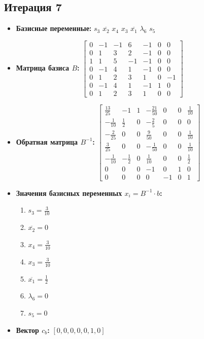 \begin{itemize}
\subsection*{Итерация 7}
\begin{itemize}
\item \textbf{Базисные переменные:}
$s_3$
$\overline{x_2}$
$x_4$
$x_3$
$\overline{x_1}$
$\lambda_6$
$s_5$
\item \textbf{Матрица базиса $B$:}
$\left[\begin{matrix}0 & -1 & -1 & 6 & -1 & 0 & 0\\0 & 1 & 3 & 2 & -1 & 0 & 0\\1 & 1 & 5 & -1 & -1 & 0 & 0\\0 & -1 & 4 & 1 & -1 & 0 & 0\\0 & 1 & 2 & 3 & 1 & 0 & -1\\0 & -1 & 4 & 1 & -1 & 1 & 0\\0 & 1 & 2 & 3 & 1 & 0 & 0\end{matrix}\right]$
\item \textbf{Обратная матрица $B^{-1}$:}
$\left[\begin{matrix}\frac{13}{25} & -1 & 1 & - \frac{21}{50} & 0 & 0 & \frac{1}{10}\\- \frac{1}{10} & \frac{1}{2} & 0 & - \frac{2}{5} & 0 & 0 & 0\\- \frac{2}{25} & 0 & 0 & \frac{9}{50} & 0 & 0 & \frac{1}{10}\\\frac{3}{25} & 0 & 0 & - \frac{1}{50} & 0 & 0 & \frac{1}{10}\\- \frac{1}{10} & - \frac{1}{2} & 0 & \frac{1}{10} & 0 & 0 & \frac{1}{2}\\0 & 0 & 0 & -1 & 0 & 1 & 0\\0 & 0 & 0 & 0 & -1 & 0 & 1\end{matrix}\right]$
\item \textbf{Значения базисных переменных $ x_i = B^{-1} \cdot b$:}
\begin{enumerate}
\item $s_3 = \frac{3}{10}$
\item $\overline{x_2} = 0$
\item $x_4 = \frac{3}{10}$
\item $x_3 = \frac{3}{10}$
\item $\overline{x_1} = \frac{1}{2}$
\item $\lambda_6 = 0$
\item $s_5 = 0$
\end{enumerate}
\item \textbf{Вектор $c_b$:}
$[0, 0, 0, 0, 0, 1, 0]$

\end{itemize}
\end{itemize}
